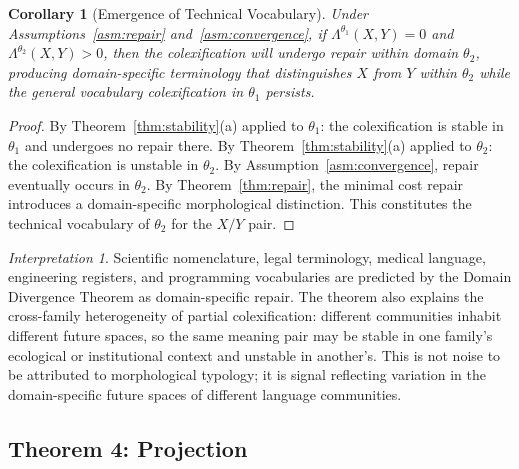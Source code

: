 \documentclass[12pt]{article}
\theoremstyle{rthm}
\newtheorem{corollary}[theorem]{Corollary}
\theoremstyle{rdef}
\theoremstyle{remark}
\newtheorem*{interpretation}{Interpretation}
\newcommand{\Lam}[1][\theta]{\Lambda^{#1}}
\begin{document}
\begin{corollary}[Emergence of Technical Vocabulary]
\label{cor:technical}
Under Assumptions~\ref{asm:repair} and~\ref{asm:convergence}, if
$\Lam[\theta_1](X,Y) = 0$ and $\Lam[\theta_2](X,Y) > 0$, then the colexification
will undergo repair within domain $\theta_2$, producing domain-specific
terminology that distinguishes $X$ from $Y$ within $\theta_2$ while the
general vocabulary colexification in $\theta_1$ persists.
\end{corollary}

\begin{proof}
By Theorem~\ref{thm:stability}(a) applied to $\theta_1$: the colexification is
stable in $\theta_1$ and undergoes no repair there. By
Theorem~\ref{thm:stability}(a) applied to $\theta_2$: the colexification is
unstable in $\theta_2$. By Assumption~\ref{asm:convergence}, repair eventually
occurs in $\theta_2$. By Theorem~\ref{thm:repair}, the minimal cost repair
introduces a domain-specific morphological distinction. This constitutes the
technical vocabulary of $\theta_2$ for the $X/Y$ pair.
\end{proof}

\begin{interpretation}
Scientific nomenclature, legal terminology, medical language, engineering
registers, and programming vocabularies are predicted by the Domain Divergence
Theorem as domain-specific repair. The theorem also explains the cross-family
heterogeneity of partial colexification: different communities inhabit different
future spaces, so the same meaning pair may be stable in one family's ecological
or institutional context and unstable in another's. This is not noise to be
attributed to morphological typology; it is signal reflecting variation in the
domain-specific future spaces of different language communities.
\end{interpretation}

\subsection{Theorem 4: Projection}
\label{subsec:t5}
\end{document}
